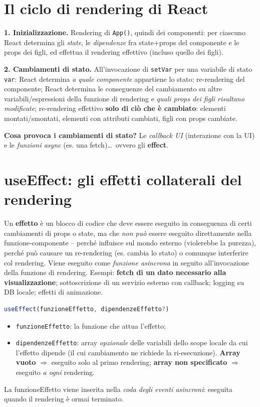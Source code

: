 \section{Il ciclo di rendering di React}

\textbf{1. Inizializzazione.} Rendering di \texttt{App()}, quindi dei componenti: per
ciascuno React determina gli \emph{state}, le \emph{dipendenze} fra state+props del
componente e le props dei figli, ed effettua il rendering effettivo (incluso quello dei
figli).

\textbf{2. Cambiamenti di stato.} All'invocazione di \texttt{setVar} per una variabile di
stato \texttt{var}: React determina \emph{a quale componente} appartiene lo stato;
re-rendering del componente; React determina le conseguenze del cambiamento su altre
variabili/espressioni della funzione di rendering e \emph{quali props dei figli risultano
modificate}; re-rendering effettivo \textbf{solo di ci\`o che \`e cambiato}: elementi
montati/smontati, elementi con attributi cambiati, figli con props cambiate.

\textbf{Cosa provoca i cambiamenti di stato?} Le \emph{callback UI} (interazione con la UI) e
le \emph{funzioni async} (es. una fetch)\dots\ ovvero gli \textbf{effect}.

\section{useEffect: gli effetti collaterali del rendering}

\begin{definizione}[Effetto]
Un \textbf{effetto} \`e un blocco di codice che deve essere eseguito in conseguenza di certi
cambiamenti di props o state, ma che \emph{non pu\`o} essere eseguito direttamente nella
funzione-componente -- perch\'e influisce sul mondo esterno (violerebbe la purezza), perch\'e
pu\`o causare un re-rendering (es. cambia lo stato) o comunque interferire col rendering.
Viene eseguito come \emph{funzione asincrona} in seguito all'invocazione della funzione di
rendering. Esempi: \textbf{fetch di un dato necessario alla visualizzazione}; sottoscrizione
di un servizio esterno con callback; logging su DB locale; effetti di animazione.
\end{definizione}

\begin{lstlisting}[language=JavaScript]
useEffect(funzioneEffetto, dipendenzeEffetto?)
\end{lstlisting}
\begin{itemize}
  \item \texttt{funzioneEffetto}: la funzione che attua l'effetto;
  \item \texttt{dipendenzeEffetto}: array \emph{opzionale} delle variabili dello scope locale
        da cui l'effetto dipende (il cui cambiamento ne richiede la ri-esecuzione).
        \textbf{Array vuoto} $\Rightarrow$ eseguito solo al primo rendering;
        \textbf{array non specificato} $\Rightarrow$ eseguito \emph{a ogni} rendering.
\end{itemize}
La funzioneEffetto viene inserita nella \emph{coda degli eventi asincroni}: eseguita quando
il rendering \`e ormai terminato.

